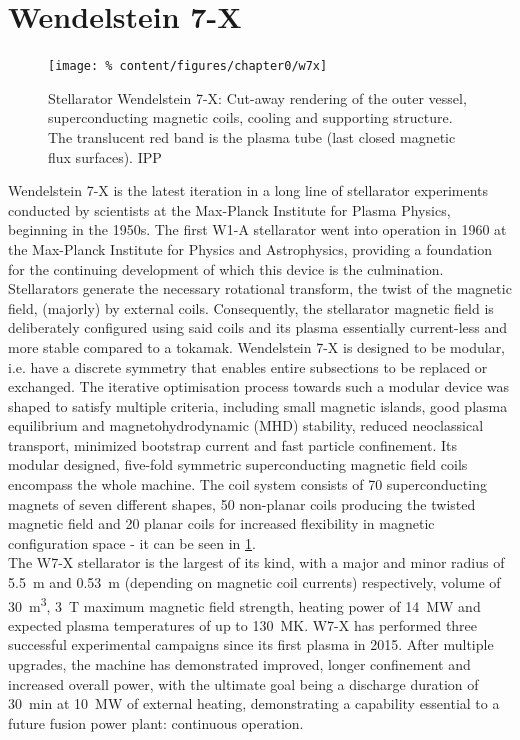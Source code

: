     \section{Wendelstein 7-X}\label{sec:w7x}%
%
        \begin{figure}%
            \centering%
            \texttt{[image: \%
                content/figures/chapter0/w7x]}%
            \caption{Stellarator Wendelstein 7-X: Cut-away rendering of the outer vessel, superconducting magnetic coils, cooling and supporting structure. The translucent red band is the plasma tube (last closed magnetic flux surfaces). \textcopyright IPP}\label{fig:w7x}%
        \end{figure}%
%
        Wendelstein 7-X is the latest iteration in a long line of stellarator experiments conducted by scientists at the Max-Planck Institute for Plasma Physics, beginning in the 1950s. The first W1-A stellarator went into operation in 1960 at the Max-Planck Institute for Physics and Astrophysics, providing a foundation for the continuing development of which this device is the culmination.\\%
        Stellarators generate the necessary rotational transform, the twist of the magnetic field, (majorly) by external coils. Consequently, the stellarator magnetic field is deliberately configured using said coils and its plasma essentially current-less and more stable compared to a tokamak. Wendelstein 7-X is designed to be modular, i.e. have a discrete symmetry that enables entire subsections to be replaced or exchanged. The iterative optimisation process towards such a modular device was shaped to satisfy multiple criteria, including small magnetic islands, good plasma equilibrium and magnetohydrodynamic (MHD) stability, reduced neoclassical transport, minimized bootstrap current and fast particle confinement. Its modular designed, five-fold symmetric superconducting magnetic field coils encompass the whole machine. The coil system consists of 70 superconducting magnets of seven different shapes, 50 non-planar coils producing the twisted magnetic field and 20 planar coils for increased flexibility in magnetic configuration space - it can be seen in \cref{fig:w7x}\cite{Spitzer1958,Boozer1998,Wagner1998,Beidler1990}.\\%
        The W7-X stellarator is the largest of its kind, with a major and minor radius of \SI{5.5}{\meter} and \SI{0.53}{\meter} (depending on magnetic coil currents) respectively, volume of \SI{30}{\cubic\meter}, \SI{3}{\tesla} maximum magnetic field strength, heating power of \SI{14}{\mega\watt} and expected plasma temperatures of up to \SI{130}{\mega\kelvin}. W7-X has performed three successful experimental campaigns since its first plasma in 2015. After multiple upgrades, the machine has demonstrated improved, longer confinement and increased overall power, with the ultimate goal being a discharge duration of \SI{30}{\minute} at \SI{10}{\mega\watt} of external heating, demonstrating a capability essential to a future fusion power plant: continuous operation\cite{Klinger2016_2}.\\%
